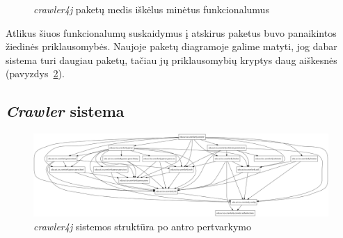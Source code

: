 \begin{figure}[H]
    \snugshade
    \endsnugshade
    \caption{\textit{crawler4j} paketų medis iškėlus minėtus funkcionalumus}
    \label{fig:crawlerjs}
\end{figure}

Atlikus šiuos funkcionalumų suskaidymus į atskirus paketus buvo panaikintos žiedinės priklausomybės.
Naujoje paketų diagramoje galime matyti, jog dabar sistema turi daugiau paketų, tačiau jų priklausomybių kryptys daug aiškesnės (pavyzdys~\ref{img:crawler_packages_v2}).
\subsection{\textit{Crawler} sistema}
\begin{figure}[H]
    \centering
    \includegraphics[scale=0.2]{img/crawler_packages_v2}
    \caption{\textit{crawler4j} sistemos struktūra po antro pertvarkymo}
    \label{img:crawler_packages_v2}
\end{figure}

